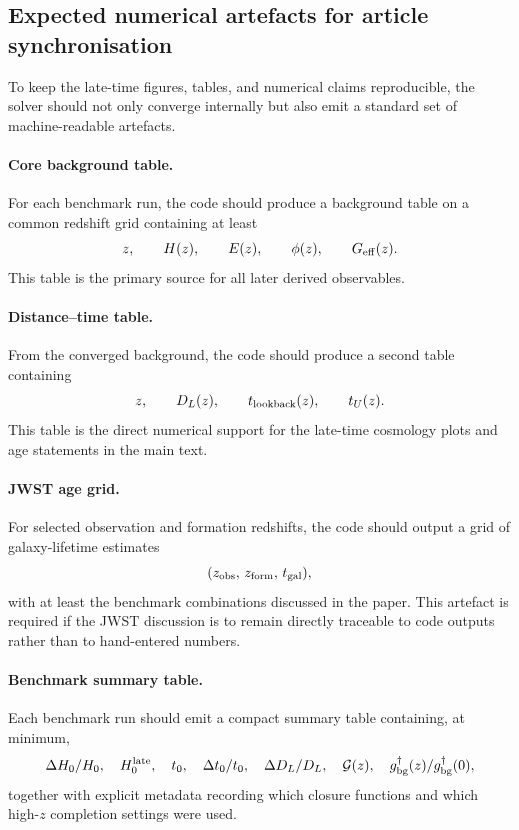 \documentclass[11pt,a4paper]{article}
\numberwithin{equation}{section}
\begin{document}
\subsection{Expected numerical artefacts for article synchronisation}
\label{sec:late_cosmo_artefacts}

To keep the late-time figures, tables, and numerical claims reproducible,
the solver should not only converge internally but also emit a standard
set of machine-readable artefacts.

\paragraph{Core background table.}
For each benchmark run, the code should produce a background table on a
common redshift grid containing at least
\[
z,\qquad H(z),\qquad E(z),\qquad \phi(z),\qquad G_{\rm eff}(z).
\]
This table is the primary source for all later derived observables.

\paragraph{Distance--time table.}
From the converged background, the code should produce a second table
containing
\[
z,\qquad D_L(z),\qquad t_{\rm lookback}(z),\qquad t_U(z).
\]
This table is the direct numerical support for the late-time cosmology
plots and age statements in the main text.

\paragraph{JWST age grid.}
For selected observation and formation redshifts, the code should output
a grid of galaxy-lifetime estimates
\[
(z_{\rm obs},\,z_{\rm form},\,t_{\rm gal}),
\]
with at least the benchmark combinations discussed in the paper.
This artefact is required if the JWST discussion is to remain directly
traceable to code outputs rather than to hand-entered numbers.

\paragraph{Benchmark summary table.}
Each benchmark run should emit a compact summary table containing, at
minimum,
\[
\Delta H_0/H_0,\quad
H_0^{\rm late},\quad
t_0,\quad
\Delta t_0/t_0,\quad
\Delta D_L/D_L,\quad
\mathcal{G}(z),\quad
g^\dagger_{\rm bg}(z)/g^\dagger_{\rm bg}(0),
\]
together with explicit metadata recording which closure functions and
which high-$z$ completion settings were used.
\end{document}
